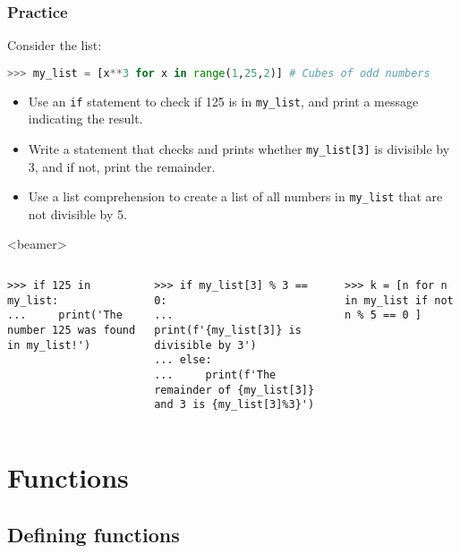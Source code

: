 \begin{frame}[fragile,label=practice_conditions]
  \frametitle{Practice}
  Consider the list:
  \begin{lstlisting}[language=Python, numbers=none]
>>> my_list = [x**3 for x in range(1,25,2)] # Cubes of odd numbers
  \end{lstlisting}  \pause
  \begin{itemize}
  \item Use an \lstinline{if} statement to check if 125 is in \lstinline{my_list}, and print a message indicating the result.
  \item Write a statement that checks and prints whether \lstinline{my_list[3]} is divisible by 3, and if not, print the remainder.
  \item Use a list comprehension to create a list of all numbers in \lstinline|my_list| that are not divisible by 5.
 \end{itemize}\pause
 \begin{onlyenv}<beamer>
  \begin{columns}[T]
    \begin{lstlisting}[]
>>> if 125 in my_list:
...     print('The number 125 was found in my_list!')
    \end{lstlisting}
    \begin{lstlisting}[]
>>> if my_list[3] % 3 == 0:
...     print(f'{my_list[3]} is divisible by 3')
... else:
...     print(f'The remainder of {my_list[3]} and 3 is {my_list[3]%3}')
    \end{lstlisting}
    \begin{lstlisting}
>>> k = [n for n in my_list if not n % 5 == 0 ]
    \end{lstlisting}
  \end{columns}
\end{onlyenv}
\end{frame}

\section{Functions}
\subsection{Defining functions}

